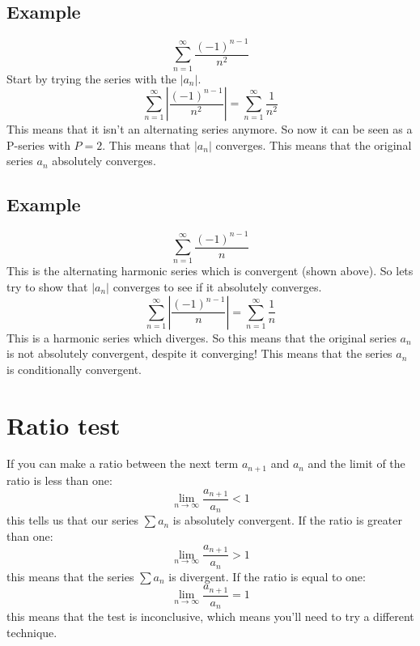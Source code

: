 \documentclass{report}
\begin{document}
    
    \subsection{Example}
        \[\sum_{n = 1}^{\infty} \frac{(-1)^{n-1}}{n^2}\]
        Start by trying the series with the \(|a_n|\).
        \[\sum_{n = 1}^{\infty} \left| \frac{(-1)^{n-1}}{n^2} \right| = \sum_{n = 1}^{\infty} \frac{1}{n^2} \]
        This means that it isn't an alternating series anymore. So now it can be seen as a P-series with \(P = 2\). This means that \(|a_n|\) converges.
        This means that the original series \(a_n\) absolutely converges.
    
    \subsection{Example}
        \[\sum_{n = 1}^{\infty} \frac{(-1)^{n-1}}{n}\]
        This is the alternating harmonic series which is convergent (shown above). So lets try to show that \(|a_n|\) converges to see if it absolutely converges.
        \[\sum_{n = 1}^{\infty} \left| \frac{(-1)^{n-1}}{n} \right| = \sum_{n = 1}^{\infty} \frac{1}{n} \]
        This is a harmonic series which diverges. So this means that the original series \(a_n\) is not absolutely convergent, despite it converging! 
        This means that the series \(a_n\) is conditionally convergent.

\newpage
\section{Ratio test}
    If you can make a ratio between the next term \(a_{n+1}\) and \(a_n\) and the limit of the ratio is less than one:
    \[\lim_{n \to \infty} \frac{a_{n+1}}{a_n} < 1 \]
    this tells us that our series \(\sum a_n\) is absolutely convergent.
    If the ratio is greater than one:
    \[\lim_{n \to \infty} \frac{a_{n+1}}{a_n} > 1 \]
    this means that the series \(\sum a_n\) is divergent.
    If the ratio is equal to one:
    \[\lim_{n \to \infty} \frac{a_{n+1}}{a_n} = 1 \]
    this means that the test is inconclusive, which means you'll need to try a different technique.
    
\end{document}
